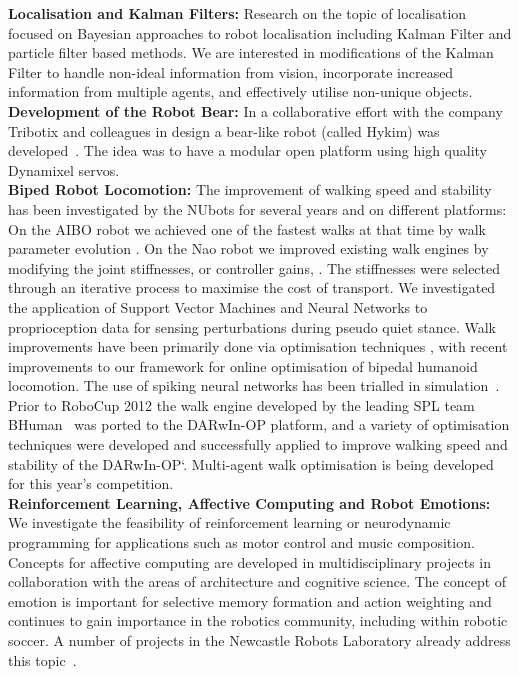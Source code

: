 \documentclass{llncs}
\begin{document}
\noindent\textbf{Localisation and Kalman Filters:} Research on the
topic of localisation focused on Bayesian approaches to robot
localisation including Kalman Filter and particle filter
based methods. We are interested in
modifications of the Kalman Filter to handle non-ideal information
from vision, incorporate increased information from multiple agents,
and effectively utilise non-unique objects.
\\

\noindent\textbf{Development of the Robot Bear:} In a collaborative
effort with the company Tribotix and colleagues in design a
bear-like robot (called Hykim) was developed~\cite{ChalupEtAl2006}. The idea was to have a modular open platform using high quality Dynamixel servos.
\\

\noindent\textbf{Biped Robot Locomotion:} The improvement of walking speed and stability has been investigated by the NUbots for several years and on different platforms: On the AIBO robot we achieved one of the fastest walks at that time by walk parameter evolution \cite{QuinlanEtAlACRA2003,ChalupEtAlSMC2007}. On the Nao robot we improved existing walk engines by modifying the joint stiffnesses, or controller gains, \cite{Kulk2008,Kulk2010,Kulk2010a}. The stiffnesses were selected through an iterative process to maximise the cost of transport. We investigated the application of Support Vector Machines and Neural Networks to proprioception data for sensing perturbations during pseudo quiet stance. Walk improvements have been primarily done via optimisation techniques \cite{Kulk2011a},  %
with recent improvements to our framework for online optimisation of bipedal humanoid locomotion.
The use of spiking neural networks has been trialled in simulation~\cite{WiklendtChalup2008}. Prior to RoboCup 2012 the walk engine developed by the leading SPL team BHuman~\cite{BHumanWalk2010} was ported to the DARwIn-OP platform, and a variety of optimisation techniques were developed and successfully applied to improve walking speed and stability of the DARwIn-OP`\cite{budden2013probabilistic}. Multi-agent walk optimisation is being developed for this year's competition.\\

\noindent\textbf{Reinforcement Learning, Affective Computing and Robot Emotions:} We investigate the feasibility of reinforcement learning or neurodynamic programming for applications such as motor control and music composition. Concepts for affective computing are developed in multidisciplinary projects in collaboration with the areas of architecture and cognitive science. The concept of emotion is important for selective memory formation and action weighting and continues to gain importance in the robotics community, including within robotic soccer. A number of projects in the Newcastle Robots Laboratory already address this topic~\cite{Pareidolia2010,HongEtAl2013a,HongEtAl2013b,WongEtAl2013}.
\\
\end{document}
